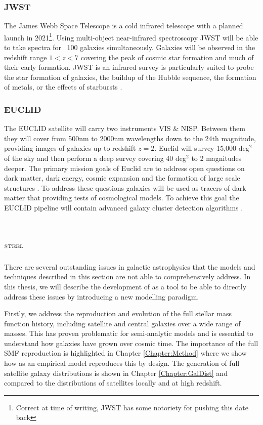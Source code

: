 \subsubsection{JWST \cite{JamesNASA}}

The James Webb Space Telescope is a cold infrared telescope with a planned launch in 2021\footnote{Correct at time of writing, JWST has some notoriety for pushing this date back}. Using multi-object near-infrared spectroscopy JWST will be able to take spectra for ~100 galaxies simultaneously. Galaxies will be observed in the redshift range $1 < z < 7$ covering the peak of cosmic star formation and much of their early formation. JWST is an infrared survey is particularly suited to probe the star formation of galaxies, the buildup of the Hubble sequence, the formation of metals, or the effects of starbursts \cite{Windhorst2009JWST2009}.  


\subsubsection{EUCLID}

The EUCLID satellite will carry two instruments VIS \& NISP. Between them they will cover from 500nm to 2000nm wavelengths down to the 24th magnitude, providing images of galaxies up to redshift $z = 2$. Euclid will survey 15,000 deg$^2$ of the sky and then perform a deep survey covering 40 deg$^2$ to 2 magnitudes deeper. The primary mission goals of Euclid are to address open questions on dark matter, dark energy, cosmic expansion and the formation of large scale structures \cite{Amendola2018CosmologySatellite}. To address these questions galaxies will be used as tracers of dark matter that providing tests of cosmological models. To achieve this goal the EUCLID pipeline will contain advanced galaxy cluster detection algorithms \cite{Adam2019EuclidSelection}.


\section{$\textsc{steel}$}

There are several outstanding issues in galactic astrophysics that the models and techniques described in this section are not able to comprehensively address. In this thesis, we will describe the development of \steel as a tool to be able to directly address these issues by introducing a new modelling paradigm. 


Firstly, we address the reproduction and evolution of the full stellar mass function history, including satellite and central galaxies over a wide range of masses. This has proven problematic for semi-analytic models \cite{Asquith2018CosmicModels} and is essential to understand how galaxies have grown over cosmic time.
The importance of the full SMF reproduction is highlighted in Chapter \ref{Chapter:Method} where we show how \steel as an empirical model reproduces this by design. The generation of full satellite galaxy distributions is shown in Chapter \ref{Chapter:GalDist} and compared to the distributions of satellites locally and at high redshift. 

